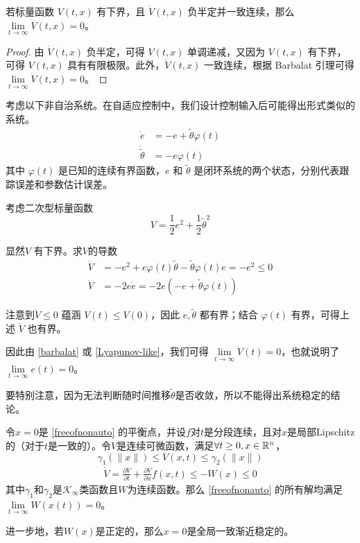 \begin{theorem}\label{Lyapunov-like}
  若标量函数 $V(t, x)$ 有下界，且 $\dot{V}(t, x)$ 负半定并一致连续，那么 $\lim\limits_{t \to \infty} \dot{V}(t, x) = 0$。
\end{theorem}
\begin{proof}
  由 $\dot{V}(t, x)$ 负半定，可得 $V (t, x)$ 单调递减，又因为 $V(t, x)$ 有下界，可得 $V (t, x)$ 具有有限极限。此外，$\dot{V}(t, x)$ 一致连续，根据 Barbalat 引理可得 $\lim\limits_{t \to \infty} \dot{V}(t, x) = 0$。
\end{proof}
\begin{example}
  考虑以下非自治系统。在自适应控制中，我们设计控制输入后可能得出形式类似的系统。
  \begin{align*}
    \dot{e} & = - e + \tilde{\theta} \varphi (t)\\
    \dot{\tilde{\theta}} & = - e \varphi (t)
  \end{align*}
  其中 $\varphi (t)$ 是已知的连续有界函数，$e$ 和 $\tilde{\theta}$ 是闭环系统的两个状态，分别代表跟踪误差和参数估计误差。
  
  考虑二次型标量函数 \[V = \frac{1}{2} e^2 + \frac{1}{2} \tilde{\theta}^2\]
  
  显然$V$ 有下界。求$V$的导数
  \begin{align*}
    \dot{V} &= - e^2+e\varphi(t)\tilde{\theta}-\tilde{\theta}\varphi(t)e= - e^2 \leq 0 \\
    \ddot{V} &= - 2 e  \dot{e} = - 2 e (- e + \tilde{\theta} \varphi (t))
  \end{align*}
  
  注意到$\dot{V} \leq 0$ 蕴涵 $V (t) \leq V (0)$，因此 $e, \tilde{\theta}$ 都有界；结合  
   $\varphi (t)$ 有界，可得上述 $\ddot{V}$ 也有界。
  
  因此由 \ref{barbalat} 或 \ref{Lyapunov-like}，我们可得 $\lim\limits_{t \rightarrow\infty} \dot{V} (t) = 0$，也就说明了 $\lim\limits_{t \rightarrow \infty} e (t) = 0$。

  \begin{remark}
    要特别注意，因为无法判断随时间推移$\tilde{\theta}$是否收敛，所以不能得出系统稳定的结论。
  \end{remark}
\end{example}
\begin{theorem}\label{LaSalle-Yoshizawa}
    令$x=0$是 \eqref{freeofnonauto} 的平衡点，并设$f$对$t$是分段连续，且对$x$是局部Lipschitz的（对于$t$是一致的）。令$V$是连续可微函数，满足$\forall t\ge 0,x\in\mathbb{R}{}^n$，\[\gamma_1(\|x\|)\le V(x,t)\le \gamma_2(\|x\|)\]
    \[\begin{aligned}\dot{V}=\frac{\partial V}{\partial t}+\frac{\partial V}{\partial x}f(x,t)\leq-W(x)\leq0\end{aligned}\]
    其中$\gamma_1$和$\gamma_2$是$\mathcal{K}_\infty$类函数且$W$为连续函数。那么  \eqref{freeofnonauto} 的所有解均满足$\lim\limits_{t\to\infty}W(x(t))=0$。
    
    进一步地，若$W(x)$是正定的，那么$x=0$是全局一致渐近稳定的。
\end{theorem}
